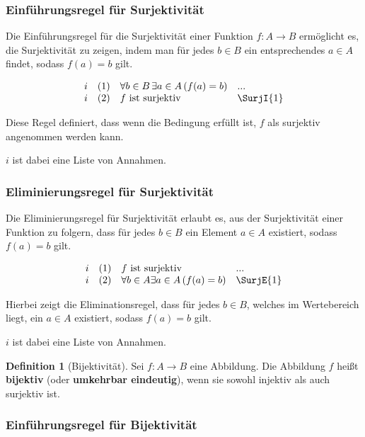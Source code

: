 \documentclass{book}
\theoremstyle{plain}
\theoremstyle{remark}
\theoremstyle{definition}
\newtheorem{definition}{Definition}[section]
\begin{document}
\subsubsection*{Einführungsregel für Surjektivität}
\label{rule:SurjI}

Die Einführungsregel für die Surjektivität einer Funktion \( f: A \to B \) ermöglicht es, die Surjektivität zu zeigen, indem man für jedes \( b \in B \) ein entsprechendes \( a \in A \) findet, sodass \( f(a) = b \) gilt.

\[
\begin{array}{llll}
    i       & (1) & \forall b \in B \, \exists a \in A \, (f(a) = b) & ... \\
    i       & (2) & f \text{ ist surjektiv} & \SurjI{1}
\end{array}
\]

Diese Regel definiert, dass wenn die Bedingung erfüllt ist, \( f \) als surjektiv angenommen werden kann.

\(i\) ist dabei eine Liste von Annahmen.

\subsubsection*{Eliminierungsregel für Surjektivität}
\label{rule:SurjE}

Die Eliminierungsregel für Surjektivität erlaubt es, aus der Surjektivität einer Funktion zu folgern, dass für jedes \( b \in B \) ein Element \( a \in A \) existiert, sodass \( f(a) = b \) gilt.

\[
\begin{array}{llll}
    i       & (1) & f \text{ ist surjektiv} & ... \\
    i     & (2) & \forall b\in A\exists a \in A \, (f(a) = b) & \SurjE{1}
\end{array}
\]

Hierbei zeigt die Eliminationsregel, dass für jedes \( b \in B \), welches im Wertebereich liegt, ein \( a \in A \) existiert, sodass \( f(a) = b \) gilt.

\(i\) ist dabei eine Liste von Annahmen.

\begin{definition}[Bijektivität]
    Sei \( f: A \to B \) eine Abbildung. Die Abbildung \( f \) heißt \textbf{bijektiv} (oder \textbf{umkehrbar eindeutig}), wenn sie sowohl injektiv als auch surjektiv ist. 
\end{definition}

\subsubsection*{Einführungsregel für Bijektivität}
\label{rule:BijectionI}
\end{document}
